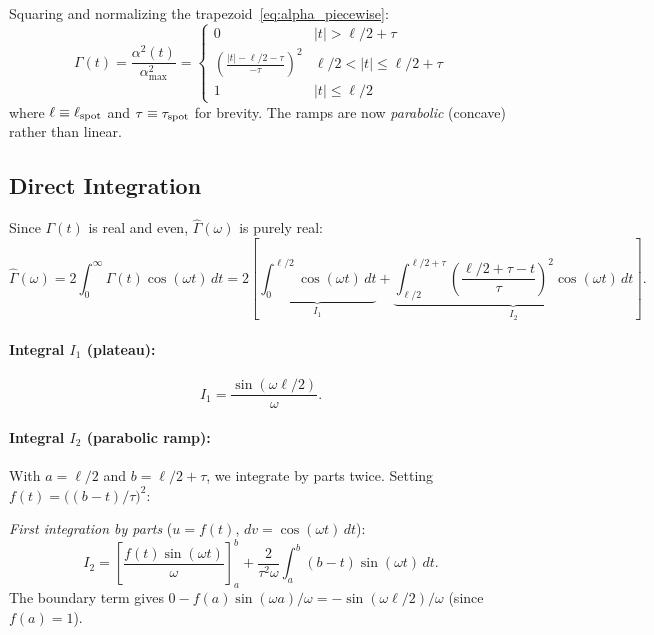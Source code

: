 \documentclass[preprint]{aastex702}
\newcommand{\FT}[1]{\hat{#1}}
\begin{document}
Squaring and normalizing the trapezoid~\eqref{eq:alpha_piecewise}:
\begin{equation}
    \Gamma(t) = \frac{\alpha^2(t)}{\alpha_{\max}^2} =
    \begin{cases}
        0 & |t| > \ell/2 + \tau \\[4pt]
        \displaystyle\left(\frac{|t| - \ell/2 - \tau}{-\tau}\right)^{\!2}
            & \ell/2 < |t| \leq \ell/2 + \tau \\[8pt]
        1 & |t| \leq \ell/2
    \end{cases}
    \label{eq:Gamma_piecewise}
\end{equation}
where $\ell \equiv \ell_{\rm spot}$ and $\tau \equiv \tau_{\rm spot}$ for brevity. The ramps are now \emph{parabolic} (concave) rather than linear.

\subsection{Direct Integration}

Since $\Gamma(t)$ is real and even, $\FT{\Gamma}(\omega)$ is purely real:
\begin{equation}
    \FT{\Gamma}(\omega) = 2\int_0^{\infty} \Gamma(t)\cos(\omega t)\,dt
    = 2\left[\underbrace{\int_0^{\ell/2}\cos(\omega t)\,dt}_{I_1}
    + \underbrace{\int_{\ell/2}^{\ell/2+\tau}\left(\frac{\ell/2 + \tau - t}{\tau}\right)^{\!2}\cos(\omega t)\,dt}_{I_2}\right].
\end{equation}

\paragraph{Integral $I_1$ (plateau):}
\begin{equation}
    I_1 = \frac{\sin(\omega\ell/2)}{\omega}.
    \label{eq:I1_plateau}
\end{equation}

\paragraph{Integral $I_2$ (parabolic ramp):}
With $a = \ell/2$ and $b = \ell/2 + \tau$, we integrate by parts twice. Setting $f(t) = \big((b-t)/\tau\big)^2$:

\emph{First integration by parts} ($u = f(t)$, $dv = \cos(\omega t)\,dt$):
\begin{equation}
    I_2 = \left[\frac{f(t)\sin(\omega t)}{\omega}\right]_a^b + \frac{2}{\tau^2\omega}\int_a^b (b-t)\sin(\omega t)\,dt.
\end{equation}
The boundary term gives $0 - f(a)\sin(\omega a)/\omega = -\sin(\omega\ell/2)/\omega$ (since $f(a) = 1$).
\end{document}
